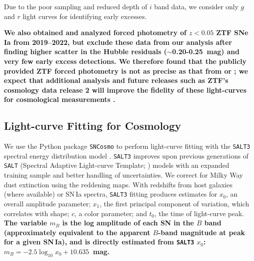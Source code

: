 \documentclass[twocolumn,twocolappendix, linenumbers]{aastex631} %
\begin{document}

Due to the poor sampling and reduced depth of $i$ band data, we consider only $g$ and $r$ light curves for identifying early excesses. 

{\bf We also obtained and analyzed forced photometry of $z < 0.05$ ZTF SNe\,Ia from 2019--2022, but exclude these data from our analysis after finding higher scatter in the Hubble residuals ($\sim$0.20-0.25~mag) and very few early excess detections.  We therefore found that the publicly provided ZTF forced photometry is not as precise as that from \citet{Yao19} or \citet{Dhawan22}; we expect that additional analysis and future releases such as ZTF's cosmology data release 2 will improve the fidelity of these light-curves for cosmological measurements \citep{rigault2024ztf}.}


\subsection{Light-curve Fitting for Cosmology}

We use the Python package \texttt{SNCosmo} to perform light-curve fitting with the \texttt{SALT3} spectral energy distribution model \citep{Kenworthy21,Taylor23}. \texttt{SALT3} improves upon previous generations of \texttt{SALT} (Spectral Adaptive Light-curve Template; \citealp{Guy05,Guy07}) models with an expanded training sample and better handling of uncertainties. We correct for Milky Way dust extinction using the \citet{Schlafly11} reddening maps. With redshifts from host galaxies (where available) or SN\,Ia spectra, \texttt{SALT3} fitting produces estimates for $x_0$, an overall amplitude parameter; $x_1$, the first principal component of variation, which correlates with shape; $c$, a color parameter; and $t_0$, the time of light-curve peak. {\bf The variable $m_B$ is the log amplitude of each SN in the $B$ band (approximately equivalent to the apparent $B$-band magnitude at peak for a given SN\,Ia), and is directly estimated from \texttt{SALT3} $x_0$: $m_B = -2.5 \log_{10} x_0 + 10.635$~mag.}
\end{document}
